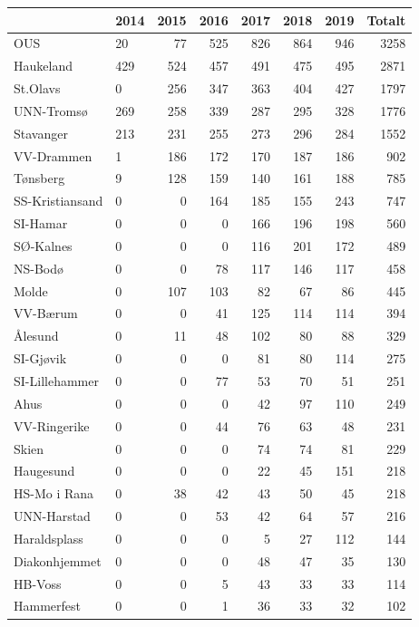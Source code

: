 \documentclass[norsk,a4paper]{article}\usepackage[]{graphicx}\usepackage[]{color}
\begin{document}
\begin{table}[ht]
\centering
\begin{tabular}{llrrrrrr}
  \hline
 & 2014 & 2015 & 2016 & 2017 & 2018 & 2019 & Totalt \\ 
  \hline
OUS & 20 & 77 & 525 & 826 & 864 & 946 & 3258 \\ 
  Haukeland & 429 & 524 & 457 & 491 & 475 & 495 & 2871 \\ 
  St.Olavs & 0 & 256 & 347 & 363 & 404 & 427 & 1797 \\ 
  UNN-Tromsø & 269 & 258 & 339 & 287 & 295 & 328 & 1776 \\ 
  Stavanger & 213 & 231 & 255 & 273 & 296 & 284 & 1552 \\ 
  VV-Drammen & 1 & 186 & 172 & 170 & 187 & 186 & 902 \\ 
  Tønsberg & 9 & 128 & 159 & 140 & 161 & 188 & 785 \\ 
  SS-Kristiansand & 0 & 0 & 164 & 185 & 155 & 243 & 747 \\ 
  SI-Hamar & 0 & 0 & 0 & 166 & 196 & 198 & 560 \\ 
  SØ-Kalnes & 0 & 0 & 0 & 116 & 201 & 172 & 489 \\ 
  NS-Bodø & 0 & 0 & 78 & 117 & 146 & 117 & 458 \\ 
  Molde & 0 & 107 & 103 & 82 & 67 & 86 & 445 \\ 
  VV-Bærum  & 0 & 0 & 41 & 125 & 114 & 114 & 394 \\ 
  Ålesund & 0 & 11 & 48 & 102 & 80 & 88 & 329 \\ 
  SI-Gjøvik & 0 & 0 & 0 & 81 & 80 & 114 & 275 \\ 
  SI-Lillehammer & 0 & 0 & 77 & 53 & 70 & 51 & 251 \\ 
  Ahus & 0 & 0 & 0 & 42 & 97 & 110 & 249 \\ 
  VV-Ringerike & 0 & 0 & 44 & 76 & 63 & 48 & 231 \\ 
  Skien & 0 & 0 & 0 & 74 & 74 & 81 & 229 \\ 
  Haugesund & 0 & 0 & 0 & 22 & 45 & 151 & 218 \\ 
  HS-Mo i Rana & 0 & 38 & 42 & 43 & 50 & 45 & 218 \\ 
  UNN-Harstad & 0 & 0 & 53 & 42 & 64 & 57 & 216 \\ 
  Haraldsplass & 0 & 0 & 0 & 5 & 27 & 112 & 144 \\ 
  Diakonhjemmet & 0 & 0 & 0 & 48 & 47 & 35 & 130 \\ 
  HB-Voss  & 0 & 0 & 5 & 43 & 33 & 33 & 114 \\ 
  Hammerfest & 0 & 0 & 1 & 36 & 33 & 32 & 102 \\ 

\end{tabular}
\end{table}
\end{document}
